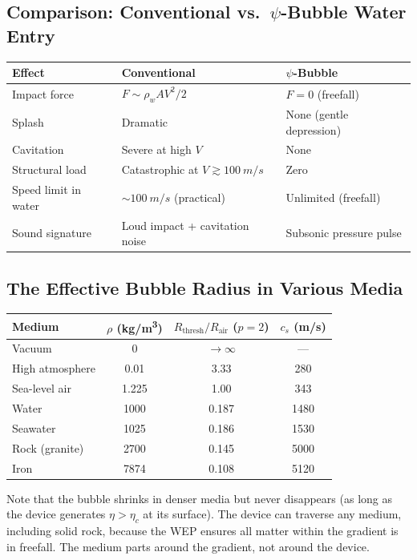 \documentclass[12pt, letterpaper]{article}
\theoremstyle{definition}
\theoremstyle{remark}
\newcommand{\etac}{\eta_c}
\newcommand{\cs}{c_s}
\begin{document}
\subsection{Comparison: Conventional vs.\ $\psi$-Bubble Water Entry}

\begin{center}
\begin{tabular}{lll}
\toprule
\textbf{Effect} & \textbf{Conventional} & \textbf{$\psi$-Bubble} \\
\midrule
Impact force & $F \sim \rho_w A V^2 / 2$ & $F = 0$ (freefall) \\
Splash & Dramatic & None (gentle depression) \\
Cavitation & Severe at high $V$ & None \\
Structural load & Catastrophic at $V \gtrsim \SI{100}{m/s}$ & Zero \\
Speed limit in water & $\sim \SI{100}{m/s}$ (practical) & Unlimited (freefall) \\
Sound signature & Loud impact + cavitation noise & Subsonic pressure pulse \\
\bottomrule
\end{tabular}
\end{center}

\subsection{The Effective Bubble Radius in Various Media}

\begin{center}
\begin{tabular}{lccc}
\toprule
\textbf{Medium} & $\rho$ (\si{kg/m^3}) & $R_{\mathrm{thresh}}/R_{\mathrm{air}}$ ($p=2$) & $\cs$ (\si{m/s}) \\
\midrule
Vacuum & 0 & $\to \infty$ & --- \\
High atmosphere & 0.01 & 3.33 & 280 \\
Sea-level air & 1.225 & 1.00 & 343 \\
Water & 1000 & 0.187 & 1480 \\
Seawater & 1025 & 0.186 & 1530 \\
Rock (granite) & 2700 & 0.145 & 5000 \\
Iron & 7874 & 0.108 & 5120 \\
\bottomrule
\end{tabular}
\end{center}

Note that the bubble shrinks in denser media but never disappears (as long as
the device generates $\eta > \etac$ at its surface). The device can traverse
any medium, including solid rock, because the WEP ensures all matter within
the gradient is in freefall. The medium parts around the gradient, not around
the device.
\end{document}
